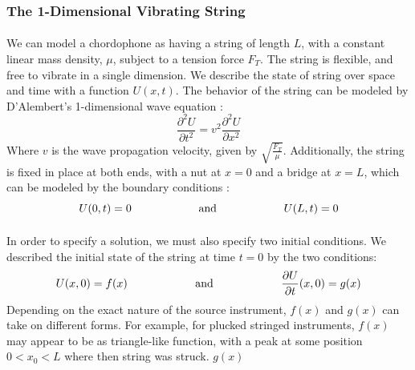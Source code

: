 \documentclass[12pt,letterpaper]{article}
\begin{document}
\subsubsection{The 1-Dimensional Vibrating String}

\paragraph*{}We can model a chordophone as having a string of length $L$, with a constant linear mass density, $\mu$, subject to a tension force $F_T$. The string is flexible, and free to vibrate in a single dimension. We describe the state of string over space and time with a function $U(x,t)$. The behavior of the string can be modeled by D'Alembert's 1-dimensional wave equation \cite{Haberman,Taylor}:
\begin{equation}
\label{eqn-1DWaveEqn}
\frac{\partial^2 U}{\partial t^2} = v^2 \frac{\partial^2 U}{\partial x^2}
\end{equation}
Where $v$ is the wave propagation velocity, given by $\sqrt{\frac{F_T}{\mu}}$. Additionally, the string is fixed in place at both ends, with a nut at $x = 0$ and a bridge at $x = L$, which can be modeled by the boundary conditions \cite{Olson,White,Haberman}:
\begin{equation}
U(0,t) = 0 
	\text{\hspace*{2cm} and \hspace*{2cm}}
U(L,t) = 0 
\end{equation}

\paragraph*{}In order to specify a solution, we must also specify two initial conditions. We described the initial state of the string at time $t = 0$  by the two conditions:
\begin{equation}
U(x,0) = f(x) 
	\text{\hspace*{2cm} and \hspace*{2cm}}
\frac{\partial U}{\partial t}(x,0) = g(x)
\end{equation}
Depending on the exact nature of the source instrument, $f(x)$ and $g(x)$ can take on different forms. For example, for plucked stringed instruments, $f(x)$ may appear to be as triangle-like function, with a peak at some position $0 < x_0 < L$ where then string was struck. $g(x)$
\end{document}
